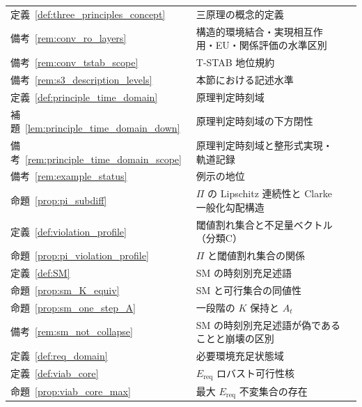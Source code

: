 \begingroup
\small
\setlength{\tabcolsep}{4pt}
\renewcommand{\arraystretch}{1.12}
\begin{longtable}{p{2.4cm} p{10.4cm} r}
定義~\ref{def:three_principles_concept} & 三原理の概念的定義 & \pageref{def:three_principles_concept} \\
備考~\ref{rem:conv_ro_layers} & 構造的環境結合・実現相互作用・EU・関係評価の水準区別 & \pageref{rem:conv_ro_layers} \\
備考~\ref{rem:conv_tstab_scope} & T-STAB 地位規約 & \pageref{rem:conv_tstab_scope} \\
備考~\ref{rem:s3_description_levels} & 本節における記述水準 & \pageref{rem:s3_description_levels} \\
定義~\ref{def:principle_time_domain} & 原理判定時刻域 & \pageref{def:principle_time_domain} \\
補題~\ref{lem:principle_time_domain_down} & 原理判定時刻域の下方閉性 & \pageref{lem:principle_time_domain_down} \\
備考~\ref{rem:principle_time_domain_scope} & 原理判定時刻域と整形式実現・軌道記録 & \pageref{rem:principle_time_domain_scope} \\
備考~\ref{rem:example_status} & 例示の地位 & \pageref{rem:example_status} \\
命題~\ref{prop:pi_subdiff} & $\Pi$ の Lipschitz 連続性と Clarke 一般化勾配構造 & \pageref{prop:pi_subdiff} \\
定義~\ref{def:violation_profile} & 閾値割れ集合と不足量ベクトル（分類C） & \pageref{def:violation_profile} \\
命題~\ref{prop:pi_violation_profile} & $\Pi$ と閾値割れ集合の関係 & \pageref{prop:pi_violation_profile} \\
定義~\ref{def:SM} & SM の時刻別充足述語 & \pageref{def:SM} \\
命題~\ref{prop:sm_K_equiv} & SM と可行集合の同値性 & \pageref{prop:sm_K_equiv} \\
命題~\ref{prop:sm_one_step_A} & 一段階の $K$ 保持と $A_t$ & \pageref{prop:sm_one_step_A} \\
備考~\ref{rem:sm_not_collapse} & SM の時刻別充足述語が偽であることと崩壊の区別 & \pageref{rem:sm_not_collapse} \\
定義~\ref{def:req_domain} & 必要環境充足状態域 & \pageref{def:req_domain} \\
定義~\ref{def:viab_core} & $E_{\mathrm{req}}$ ロバスト可行性核 & \pageref{def:viab_core} \\
命題~\ref{prop:viab_core_max} & 最大 $E_{\mathrm{req}}$ 不変集合の存在 & \pageref{prop:viab_core_max} \\

\end{longtable}
